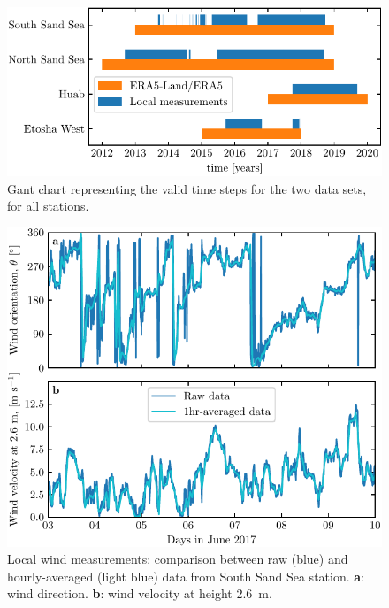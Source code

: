 \begin{figure}[p]
\centering
\includegraphics[scale=1]{Figures/Figure1_supp.pdf}
\caption{Gant chart representing the valid time steps for the two data sets, for all stations.}
\label{Fig1_supp}
\end{figure}

\begin{figure}[p]
\centering
\includegraphics[scale=1]{Figures/Figure2_supp.pdf}
\caption{Local wind measurements: comparison between raw (blue) and hourly-averaged (light blue) data from South Sand Sea station. \textbf{a}: wind direction. \textbf{b}: wind velocity at height $2.6$~m.}
\label{Fig2_supp}
\end{figure}

